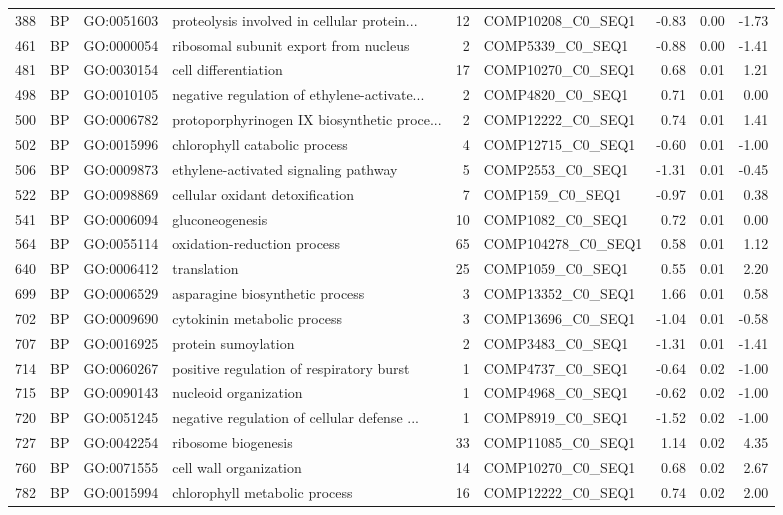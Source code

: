 \documentclass[10pt,oneside,a4paper]{article}
\begin{document}
\begin{table}[ht]
\begin{tabular}{rlllrlrrr}
  388 & BP & GO:0051603 & proteolysis involved in cellular protein... &  12 & COMP10208\_C0\_SEQ1 & -0.83 & 0.00 & -1.73 \\ 
  461 & BP & GO:0000054 & ribosomal subunit export from nucleus &   2 & COMP5339\_C0\_SEQ1 & -0.88 & 0.00 & -1.41 \\ 
  481 & BP & GO:0030154 & cell differentiation &  17 & COMP10270\_C0\_SEQ1 & 0.68 & 0.01 & 1.21 \\ 
  498 & BP & GO:0010105 & negative regulation of ethylene-activate... &   2 & COMP4820\_C0\_SEQ1 & 0.71 & 0.01 & 0.00 \\ 
  500 & BP & GO:0006782 & protoporphyrinogen IX biosynthetic proce... &   2 & COMP12222\_C0\_SEQ1 & 0.74 & 0.01 & 1.41 \\ 
  502 & BP & GO:0015996 & chlorophyll catabolic process &   4 & COMP12715\_C0\_SEQ1 & -0.60 & 0.01 & -1.00 \\ 
  506 & BP & GO:0009873 & ethylene-activated signaling pathway &   5 & COMP2553\_C0\_SEQ1 & -1.31 & 0.01 & -0.45 \\ 
  522 & BP & GO:0098869 & cellular oxidant detoxification &   7 & COMP159\_C0\_SEQ1 & -0.97 & 0.01 & 0.38 \\ 
  541 & BP & GO:0006094 & gluconeogenesis &  10 & COMP1082\_C0\_SEQ1 & 0.72 & 0.01 & 0.00 \\ 
  564 & BP & GO:0055114 & oxidation-reduction process &  65 & COMP104278\_C0\_SEQ1 & 0.58 & 0.01 & 1.12 \\ 
  640 & BP & GO:0006412 & translation &  25 & COMP1059\_C0\_SEQ1 & 0.55 & 0.01 & 2.20 \\ 
  699 & BP & GO:0006529 & asparagine biosynthetic process &   3 & COMP13352\_C0\_SEQ1 & 1.66 & 0.01 & 0.58 \\ 
  702 & BP & GO:0009690 & cytokinin metabolic process &   3 & COMP13696\_C0\_SEQ1 & -1.04 & 0.01 & -0.58 \\ 
  707 & BP & GO:0016925 & protein sumoylation &   2 & COMP3483\_C0\_SEQ1 & -1.31 & 0.01 & -1.41 \\ 
  714 & BP & GO:0060267 & positive regulation of respiratory burst &   1 & COMP4737\_C0\_SEQ1 & -0.64 & 0.02 & -1.00 \\ 
  715 & BP & GO:0090143 & nucleoid organization &   1 & COMP4968\_C0\_SEQ1 & -0.62 & 0.02 & -1.00 \\ 
  720 & BP & GO:0051245 & negative regulation of cellular defense ... &   1 & COMP8919\_C0\_SEQ1 & -1.52 & 0.02 & -1.00 \\ 
  727 & BP & GO:0042254 & ribosome biogenesis &  33 & COMP11085\_C0\_SEQ1 & 1.14 & 0.02 & 4.35 \\ 
  760 & BP & GO:0071555 & cell wall organization &  14 & COMP10270\_C0\_SEQ1 & 0.68 & 0.02 & 2.67 \\ 
  782 & BP & GO:0015994 & chlorophyll metabolic process &  16 & COMP12222\_C0\_SEQ1 & 0.74 & 0.02 & 2.00 \\ 
   \hline
\end{tabular} 
\end{table}
\end{document}
